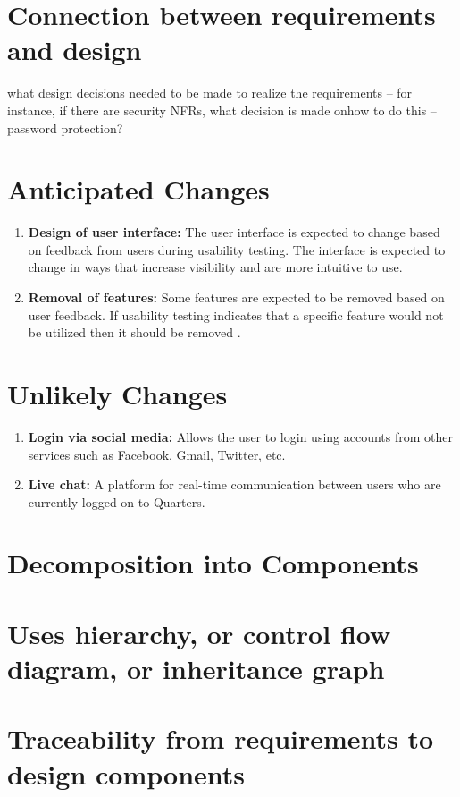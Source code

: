 \documentclass[12pt]{article}
\begin{document}
\section{Connection between requirements and design}
what design decisions needed to be made to realize the requirements – for instance, if there are security NFRs, what decision is made onhow to do this – password protection?

\section{Anticipated Changes}
\begin{enumerate}
  \item \textbf{Design of user interface:} The user interface is expected to change based on feedback from users during usability testing. The interface is expected to change in ways that increase visibility and are more intuitive to use.
  \item \textbf{Removal of features:} Some features are expected to be removed based on user feedback. If usability testing indicates that a specific feature would not be utilized then it should be removed .
\end{enumerate}

\section{Unlikely Changes}
\begin{enumerate}
  \item \textbf{Login via social media:} Allows the user to login using accounts from other services such as Facebook, Gmail, Twitter, etc.
  \item \textbf{Live chat:} A platform for real-time communication between users who are currently logged on to Quarters.
\end{enumerate}

%
\section{Decomposition into Components}

%
\section{Uses hierarchy, or control flow diagram, or inheritance graph}

%
\section{Traceability from requirements to design components}
\end{document}
